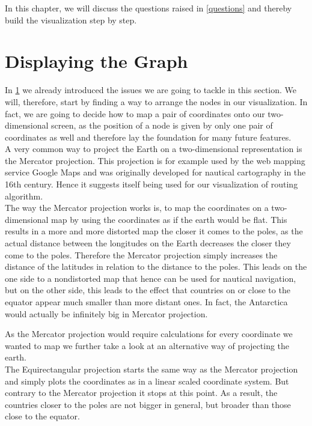 \documentclass
[
	paper = a4,
    pagesize,
	12 pt,
	oneside,                       %
    open = right,
	DIV = calc,
	BCOR = 0 mm,                   %
	bibtotoc
]
{scrbook}
\begin{document}
In this chapter, we will discuss the questions raised in \cref{questions} and thereby build the visualization step by step.


\section{Displaying the Graph} \label{graph}

In \cref{graph} we already introduced the issues we are going to tackle in this section.
We will, therefore, start by finding a way to arrange the nodes in our visualization.
In fact, we are going to decide how to map a pair of coordinates onto our two-dimensional screen, as the position of a node is given by only one pair of coordinates as well and therefore lay the foundation for many future features.\\

A very common way to project the Earth on a two-dimensional representation is the Mercator projection.
This projection is for example used by the web mapping service Google Maps and was originally developed for nautical cartography in the 16th century.
Hence it suggests itself being used for our visualization of routing algorithm.\\
The way the Mercator projection works is, to map the coordinates on a two-dimensional map by using the coordinates as if the earth would be flat.
This results in a more and more distorted map the closer it comes to the poles, as the actual distance between the longitudes on the Earth decreases the closer they come to the poles.
Therefore the Mercator projection simply increases the distance of the latitudes in relation to the distance to the poles.
This leads on the one side to a nondistorted map that hence can be used for nautical navigation, but on the other side, this leads to the effect that countries on or close to the equator appear much smaller than more distant ones.
In fact, the Antarctica would actually be infinitely big in Mercator projection.

As the Mercator projection would require calculations for every coordinate we wanted to map we further take a look at an alternative way of projecting the earth.\\
The Equirectangular projection starts the same way as the Mercator projection and simply plots the coordinates as in a linear scaled coordinate system.
But contrary to the Mercator projection it stops at this point.
As a result, the countries closer to the poles are not bigger in general, but broader than those close to the equator.
\end{document}
